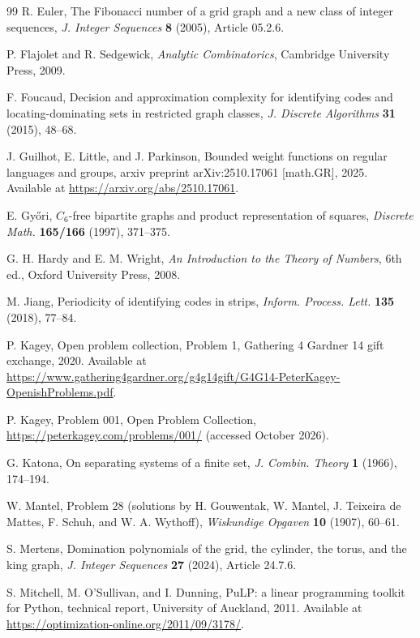 \documentclass[12pt]{article}
\theoremstyle{plain}
\theoremstyle{definition}
\theoremstyle{remark}
\begin{document}
\begin{thebibliography}{99}
R. Euler, The Fibonacci number of a grid graph and a new class of integer sequences,
\emph{J. Integer Sequences} \textbf{8} (2005), Article 05.2.6.

P. Flajolet and R. Sedgewick, \emph{Analytic Combinatorics}, Cambridge University
Press, 2009.

F. Foucaud, Decision and approximation complexity for identifying codes and
locating-dominating sets in restricted graph classes, \emph{J. Discrete Algorithms}
\textbf{31} (2015), 48--68.

J. Guilhot, E. Little, and J. Parkinson, Bounded weight functions on regular languages
and groups, arxiv preprint arXiv:2510.17061 [math.GR], 2025. Available at
\url{https://arxiv.org/abs/2510.17061}.

E. Gy\H{o}ri, $C_6$-free bipartite graphs and product representation of squares,
\emph{Discrete Math.} \textbf{165/166} (1997), 371--375.

G. H. Hardy and E. M. Wright, \emph{An Introduction to the Theory of Numbers}, 6th ed.,
Oxford University Press, 2008.

M. Jiang, Periodicity of identifying codes in strips, \emph{Inform. Process. Lett.}
\textbf{135} (2018), 77--84.

P. Kagey, Open problem collection, Problem 1, Gathering 4 Gardner 14 gift exchange,
2020. Available at
\url{https://www.gathering4gardner.org/g4g14gift/G4G14-PeterKagey-OpenishProblems.pdf}.

P. Kagey, Problem 001, Open Problem Collection,
\url{https://peterkagey.com/problems/001/} (accessed October 2026).

G. Katona, On separating systems of a finite set, \emph{J. Combin. Theory}
\textbf{1} (1966), 174--194.

W. Mantel, Problem 28 (solutions by H. Gouwentak, W. Mantel, J. Teixeira de Mattes,
F. Schuh, and W. A. Wythoff), \emph{Wiskundige Opgaven} \textbf{10} (1907), 60--61.

S. Mertens, Domination polynomials of the grid, the cylinder, the torus, and the king
graph, \emph{J. Integer Sequences} \textbf{27} (2024), Article 24.7.6.

S. Mitchell, M. O'Sullivan, and I. Dunning, PuLP: a linear programming toolkit for
Python, technical report, University of Auckland, 2011. Available at
\url{https://optimization-online.org/2011/09/3178/}.


\end{thebibliography}
\end{document}
